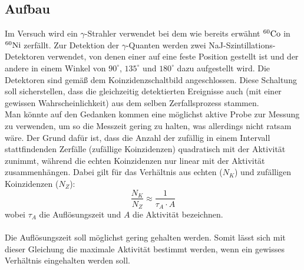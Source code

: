 \documentclass[a4paper,titlepage]{scrartcl}
\numberwithin{equation}{section}
\begin{document}
\subsection{Aufbau}
Im Versuch wird ein $\gamma$-Strahler verwendet bei dem wie bereits erwähnt $^{60}\ce{Co}$ in $^{60}\ce{Ni}$ zerfällt. Zur Detektion der $\gamma$-Quanten werden zwei NaJ-Szintillations-Detektoren verwendet, von denen einer auf eine feste Position gestellt ist und der andere in einem Winkel von $90^\circ$, $135^\circ$ und $180^\circ$ dazu aufgestellt wird. Die Detektoren sind gemäß dem Koinzidenzschaltbild angeschlossen. Diese Schaltung soll sicherstellen, dass die gleichzeitig detektierten Ereignisse auch (mit einer gewissen Wahrscheinlichkeit) aus dem selben Zerfallsprozess stammen.\\
Man könnte auf den Gedanken kommen eine möglichst aktive Probe zur Messung zu verwenden, um so die Messzeit gering zu halten, was allerdings nicht ratsam wäre. Der Grund dafür ist, dass die Anzahl der zufällig in einem Intervall stattfindenden Zerfälle (zufällige Koinzidenzen) quadratisch mit der Aktivität zunimmt, während die echten Koinzidenzen nur linear mit der Aktivität zusammenhängen. Dabei gilt für das Verhältnis aus echten ($N_K$) und zufälligen Koinzidenzen ($N_Z$):
\begin{equation}
\label{eq:aufloesungszeit}
\frac{N_K}{N_Z} \approx \frac{1}{\tau_A \cdot A}
\end{equation}
wobei $\tau_A$ die Auflösungszeit und $A$ die Aktivität bezeichnen.\\ \\
Die Auflösungszeit soll möglichst gering gehalten werden. Somit lässt sich mit dieser Gleichung die maximale Aktivität bestimmt werden, wenn ein gewisses Verhältnis eingehalten werden soll.
\end{document}
